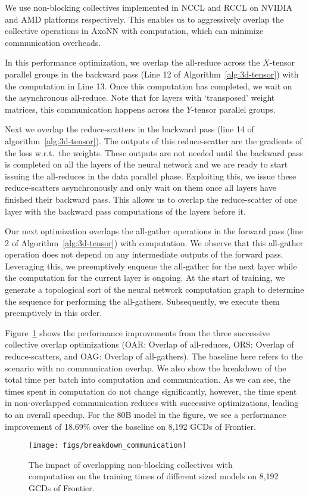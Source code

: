 We use non-blocking collectives implemented in NCCL and RCCL on NVIDIA and AMD
platforms respectively. This enables us to aggressively overlap the collective
operations in AxoNN with computation, which can minimize communication
overheads.

\vspace{0.08in}
In this performance optimization, we overlap the all-reduce across the
$X$-tensor parallel groups in the backward pass (Line 12 of
Algorithm~\ref{alg:3d-tensor}) with the computation in Line 13. Once this
computation has completed, we wait on the asynchronous all-reduce.
Note that for layers with `transposed' weight matrices, this communication happens across the $Y$-tensor parallel groups.  

\vspace{0.08in}
Next we overlap the reduce-scatters in the backward pass (line 14 of
algorithm~\ref{alg:3d-tensor}). The outputs of this reduce-scatter are the
gradients of the loss w.r.t.~the weights. These outputs are not needed until
the backward pass is completed on all the layers of the neural network and we
are ready to start issuing the all-reduces in the data parallel phase.
Exploiting this, we issue these reduce-scatters asynchronously and only wait on
them once all layers have finished their backward pass. This allows us to
overlap the reduce-scatter of one layer with the backward pass computations of
the layers before it.

\vspace{0.08in}
Our next optimization overlaps the all-gather operations in the forward pass
(line 2 of Algorithm~\ref{alg:3d-tensor}) with computation. We observe that
this all-gather operation does not depend on any intermediate outputs of the
forward pass. Leveraging this, we preemptively enqueue the all-gather for the
next layer while the computation for the current layer is ongoing. At the start
of training, we generate a topological sort of the neural network computation
graph to determine the sequence for performing the all-gathers. Subsequently,
we execute them preemptively in this order.

Figure~\ref{fig:opt} shows the performance improvements from the three
successive collective overlap optimizations (OAR: Overlap of all-reduces, ORS:
Overlap of reduce-scatters, and OAG: Overlap of all-gathers). The baseline here
refers to the scenario with no communication overlap. We also show the breakdown of the total time per
batch into computation and communication. As we can see, the times spent in
computation do not change significantly, however, the time spent in non-overlapped
communication reduces with successive optimizations, leading to an overall
speedup. For the 80B model in the figure, we see a performance improvement of 18.69\%
over the baseline on 8,192 GCDs of Frontier.

\begin{figure}[h]
    \centering
      \texttt{[image: figs/breakdown\_communication]}
      \caption{The impact of overlapping non-blocking collectives with
computation on the training times of different sized models on 8,192 GCDs of Frontier.}
\label{fig:opt}
\end{figure}

